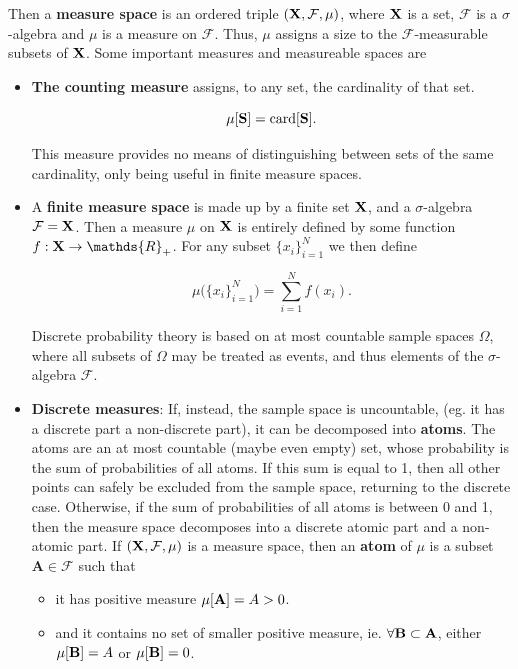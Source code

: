 \documentclass{homework}
\begin{document}
Then a \textbf{measure space} is an ordered triple $({\bf X}, \mathcal{F}, \mu)$, where ${\bf X}$ is a set, $\mathcal{F}$ is a $\sigma$-algebra and $\mu$ is a measure on $\mathcal{F}$. Thus, $\mu$ assigns a size to the $\mathcal{F}$-measurable subsets of ${\bf X}$. Some important measures and measureable spaces are

\begin{itemize}
    \item \textbf{The counting measure} assigns, to any set, the cardinality of that set. 
    
    $$
    \mu[{\bf S}] =\textnormal{card}[{\bf S}].
    $$
    
    This measure provides no means of distinguishing between sets of the same cardinality, only being useful in finite measure spaces. \\
    
    \item A \textbf{finite measure space} is made up by a finite set ${\bf X}$, and a $\sigma$-algebra $\mathcal{F}= {\bf X}$. Then a measure $\mu$ on ${\bf X}$ is entirely defined by some function $f: {\bf X} \rightarrow \mathds{R}_{+}$. For any subset $\{x_i\}_{i=1}^{N}$ we then define 
    
    $$
    \mu\bigg(\{x_i\}_{i=1}^{N}\bigg)= \sum_{i=1}^{N}f(x_i).
    $$
    
    Discrete probability theory is based on at most countable sample spaces $\Omega$, where all subsets of $\Omega$ may be treated as events, and thus elements of the $\sigma$-algebra $\mathcal{F}$. \\
    
    \item \textbf{Discrete measures}: If, instead, the sample space is uncountable, (eg. it has a discrete part a non-discrete part), it can be decomposed into \textbf{atoms}. The atoms are an at most countable (maybe even empty) set, whose probability is the sum of probabilities of all atoms. If this sum is equal to 1, then all other points can safely be excluded from the sample space, returning to the discrete case. Otherwise, if the sum of probabilities of all atoms is between 0 and 1, then the measure space decomposes into a discrete atomic part and a non-atomic part.    If $({\bf X}, \mathcal{F},\mu)$ is a measure space, then an \textbf{atom} of $\mu$ is a subset $\mathbf{A} \in \mathcal{F}$ such that
    
    \begin{itemize}
        \item it has positive measure $\mu[{\bf A}] = A > 0$.
        \item and it contains no set of smaller positive measure, ie. $\forall {\bf B} \subset {\bf A}$, either $\mu[{\bf B}] = A$ or $\mu[{\bf B}] = 0$.\\
    \end{itemize}
    

\end{itemize}
\end{document}
